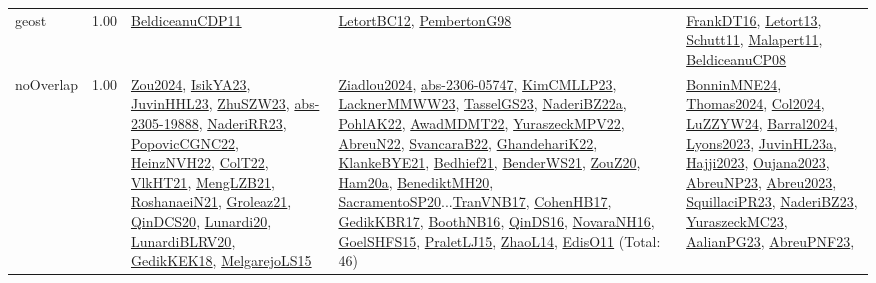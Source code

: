 {\begin{longtable}{p{3cm}r>{\raggedright\arraybackslash}p{6cm}>{\raggedright\arraybackslash}p{6cm}>{\raggedright\arraybackslash}p{8cm}}
\index{geost}\index{Constraints!geost}geost &  1.00 & \hyperref[detail:BeldiceanuCDP11]{BeldiceanuCDP11} & \hyperref[detail:LetortBC12]{LetortBC12}, \hyperref[detail:PembertonG98]{PembertonG98} & \hyperref[detail:FrankDT16]{FrankDT16}, \hyperref[detail:Letort13]{Letort13}, \hyperref[detail:Schutt11]{Schutt11}, \hyperref[detail:Malapert11]{Malapert11}, \hyperref[detail:BeldiceanuCP08]{BeldiceanuCP08}\\
\index{noOverlap}\index{Constraints!noOverlap}noOverlap &  1.00 & \hyperref[detail:Zou2024]{Zou2024}, \hyperref[detail:IsikYA23]{IsikYA23}, \hyperref[detail:JuvinHHL23]{JuvinHHL23}, \hyperref[detail:ZhuSZW23]{ZhuSZW23}, \hyperref[detail:abs-2305-19888]{abs-2305-19888}, \hyperref[detail:NaderiRR23]{NaderiRR23}, \hyperref[detail:PopovicCGNC22]{PopovicCGNC22}, \hyperref[detail:HeinzNVH22]{HeinzNVH22}, \hyperref[detail:ColT22]{ColT22}, \hyperref[detail:VlkHT21]{VlkHT21}, \hyperref[detail:MengLZB21]{MengLZB21}, \hyperref[detail:RoshanaeiN21]{RoshanaeiN21}, \hyperref[detail:Groleaz21]{Groleaz21}, \hyperref[detail:QinDCS20]{QinDCS20}, \hyperref[detail:Lunardi20]{Lunardi20}, \hyperref[detail:LunardiBLRV20]{LunardiBLRV20}, \hyperref[detail:GedikKEK18]{GedikKEK18}, \hyperref[detail:MelgarejoLS15]{MelgarejoLS15} & \hyperref[detail:Ziadlou2024]{Ziadlou2024}, \hyperref[detail:abs-2306-05747]{abs-2306-05747}, \hyperref[detail:KimCMLLP23]{KimCMLLP23}, \hyperref[detail:LacknerMMWW23]{LacknerMMWW23}, \hyperref[detail:TasselGS23]{TasselGS23}, \hyperref[detail:NaderiBZ22a]{NaderiBZ22a}, \hyperref[detail:PohlAK22]{PohlAK22}, \hyperref[detail:AwadMDMT22]{AwadMDMT22}, \hyperref[detail:YuraszeckMPV22]{YuraszeckMPV22}, \hyperref[detail:AbreuN22]{AbreuN22}, \hyperref[detail:SvancaraB22]{SvancaraB22}, \hyperref[detail:GhandehariK22]{GhandehariK22}, \hyperref[detail:KlankeBYE21]{KlankeBYE21}, \hyperref[detail:Bedhief21]{Bedhief21}, \hyperref[detail:BenderWS21]{BenderWS21}, \hyperref[detail:ZouZ20]{ZouZ20}, \hyperref[detail:Ham20a]{Ham20a}, \hyperref[detail:BenediktMH20]{BenediktMH20}, \hyperref[detail:SacramentoSP20]{SacramentoSP20}...\hyperref[detail:TranVNB17]{TranVNB17}, \hyperref[detail:CohenHB17]{CohenHB17}, \hyperref[detail:GedikKBR17]{GedikKBR17}, \hyperref[detail:BoothNB16]{BoothNB16}, \hyperref[detail:QinDS16]{QinDS16}, \hyperref[detail:NovaraNH16]{NovaraNH16}, \hyperref[detail:GoelSHFS15]{GoelSHFS15}, \hyperref[detail:PraletLJ15]{PraletLJ15}, \hyperref[detail:ZhaoL14]{ZhaoL14}, \hyperref[detail:EdisO11]{EdisO11} (Total: 46) & \hyperref[detail:BonninMNE24]{BonninMNE24}, \hyperref[detail:Thomas2024]{Thomas2024}, \hyperref[detail:Col2024]{Col2024}, \hyperref[detail:LuZZYW24]{LuZZYW24}, \hyperref[detail:Barral2024]{Barral2024}, \hyperref[detail:Lyons2023]{Lyons2023}, \hyperref[detail:JuvinHL23a]{JuvinHL23a}, \hyperref[detail:Hajji2023]{Hajji2023}, \hyperref[detail:Oujana2023]{Oujana2023}, \hyperref[detail:AbreuNP23]{AbreuNP23}, \hyperref[detail:Abreu2023]{Abreu2023}, \hyperref[detail:SquillaciPR23]{SquillaciPR23}, \hyperref[detail:NaderiBZ23]{NaderiBZ23}, \hyperref[detail:YuraszeckMC23]{YuraszeckMC23}, \hyperref[detail:AalianPG23]{AalianPG23}, \hyperref[detail:AbreuPNF23]{AbreuPNF23}, 
\end{longtable}}
